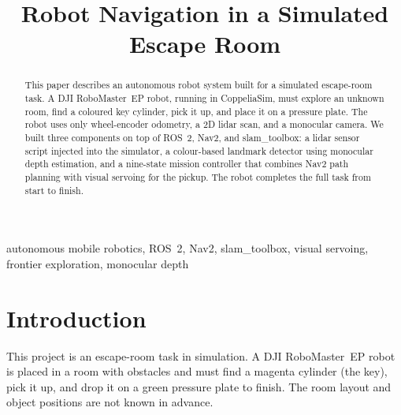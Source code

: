 \documentclass[conference]{IEEEtran}
\begin{document}
\title{Robot Navigation in a Simulated Escape Room}

\author{
\and
{}
\and
{}
}

\maketitle

\begin{abstract}
This paper describes an autonomous robot system built for a
simulated escape-room task.
A DJI RoboMaster~EP robot, running in CoppeliaSim, must explore
an unknown room, find a coloured key cylinder, pick it up, and
place it on a pressure plate.
The robot uses only wheel-encoder odometry, a 2D lidar scan,
and a monocular camera.
We built three components on top of ROS~2, Nav2, and slam\_toolbox:
a lidar sensor script injected into the simulator, a colour-based
landmark detector using monocular depth estimation, and a nine-state
mission controller that combines Nav2 path planning with
visual servoing for the pickup.
The robot completes the full task from start to finish.
\end{abstract}

\begin{IEEEkeywords}
autonomous mobile robotics, ROS~2, Nav2, slam\_toolbox,
visual servoing, frontier exploration, monocular depth
\end{IEEEkeywords}

\section{Introduction}

This project is an escape-room task in simulation.
A DJI RoboMaster~EP robot is placed in a room with obstacles and
must find a magenta cylinder (the key), pick it up, and drop it on
a green pressure plate to finish.
The room layout and object positions are not known in advance.
\end{document}
